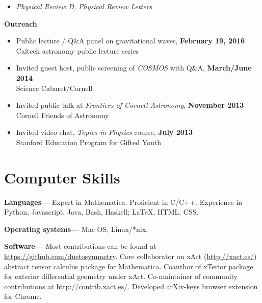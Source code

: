 \documentclass[margin,line]{res}
\begin{document}
\begin{resume}
\begin{itemize}
\item[] {\it Physical Review D, Physical Review Letters}
\end{itemize}
{\bf Outreach}
\vspace*{.05in}
\begin{itemize}
\item[] Public lecture / Q\&A panel on gravitational waves,
  \hfill {\bf February 19, 2016} \\
\hspace*{1em} Caltech astronomy public lecture series
\item[] Invited guest host, public screening of {\it COSMOS} with Q\&A,
  \hfill {\bf March/June 2014} \\
\hspace*{1em} Science Cabaret/Cornell
\item[] Invited public talk at {\it Frontiers of Cornell Astronomy}, \hfill {\bf November 2013} \\
\hspace*{1em} Cornell Friends of Astronomy
\item[] Invited video chat, {\it Topics in Physics} course, \hfill {\bf July 2013} \\
\hspace*{1em} Stanford Education Program for Gifted Youth
\end{itemize}

\section{\sc Computer Skills}
{\bf Languages---}%
Expert in {\sc Mathematica}. Proficient in C/C++. Experience in
Python, Javascript, Java, Bash, Haskell; LaTeX, HTML, CSS.

{\bf Operating systems---}%
Mac OS, Linux/*nix.

{\bf Software---}%
Most contributions can be found at \url{https://github.com/duetosymmetry}.
Core collaborator on {\sc xAct} (\url{http://xact.es/}) abstract
tensor calculus package for {\sc  Mathematica}. Coauthor
of {\sc xTerior} package for exterior differential geometry under
{\sc xAct}. Co-maintainer of community contributions at
\url{http://contrib.xact.es/}. Developed
\href{https://chrome.google.com/webstore/detail/arxiv-keys/fkjjdlbhliopfhgddlpoggpmpgjfaojd}{arXiv-keys}
browser extension for Chrome.

\newpage{}


\end{resume}
\end{document}

